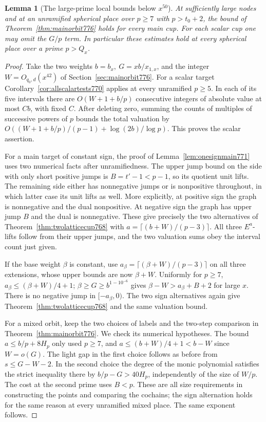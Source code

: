 \documentclass[a4paper,11pt]{article}
\newtheorem{lemma}[proposition]{Lemma}
\theoremstyle{definition}
\theoremstyle{remark}
\numberwithin{equation}{section}
\begin{document}
\begin{lemma}[The large-prime local bounds below \(x^{50}\)]
\leavevmode\label{lem:rankcutoff778}
At sufficiently large nodes and at an unramified spherical
place over \(p\ge7\) with \(p>t_0+2\), the bound of
Theorem~\ref{thm:mainorbit776} holds for every main cup.
For each scalar cup one may omit the \(G/p\) term.
In particular these estimates hold at every spherical
place over a prime \(p> Q_x\).
\end{lemma}
\begin{proof}
Take the two weights \(b=b_x,\ G=xb/x_{1,x}\), and the
integer \(W=O_{q_0,d}(x^{42})\) of
Section~\ref{sec:mainorbit776}. For a scalar target
Corollary~\ref{cor:allscalartests770} applies at every
unramified \(p\ge5\). In each of its five intervals there
are \(O(W+1+b/p)\) consecutive integers of absolute value
at most \(C b\), with fixed \(C\). After deleting zero,
summing the counts of multiples of successive powers
of \(p\) bounds the total valuation by
\(O((W+1+b/p)/(p-1)+\log(2b)/\log p)\).
This proves the scalar assertion.

For a main target of constant sign, the proof of
Lemma~\ref{lem:onesignmain771} uses two numerical facts
after unramifiedness. The upper jump bound on the side
with only short positive jumps is \(B=t'-1<p-1\), so
its quotient unit lifts. The remaining side either has
nonnegative jumps or is nonpositive throughout, in
which latter case its unit lifts as well. More explicitly,
at positive sign the graph is nonnegative and the dual
nonpositive. At negative sign the graph has upper jump
\(B\) and the dual is nonnegative. These give precisely
the two alternatives of Theorem~\ref{thm:twolatticecup768}
with \(a=\lceil(b+W)/(p-3)\rceil\). All three \(E^a\)-lifts
follow from their upper jumps, and the two valuation sums
obey the interval count just given.

If the base weight \(\beta\) is constant, use
\(a_\beta=\lceil(\beta+W)/(p-3)\rceil\) on all three
extensions, whose upper bounds are now \(\beta+W\).
Uniformly for \(p\ge7\), \(a_\beta\le(\beta+W)/4+1\);
\(\beta\ge G\ge b^{1-10^{-6}}\) gives
\(\beta-W>a_\beta+B+2\) for large \(x\).
There is no negative jump in \([-a_\beta,0)\). The two
sign alternatives again give Theorem~\ref{thm:twolatticecup768}
and the same valuation bound.

For a mixed orbit, keep the two choices of labels and
the two-step comparison in Theorem~\ref{thm:mainorbit776}.
We check its numerical hypotheses. The bound
\(a\le b/p+8H_p\) only used \(p\ge7\), and
\(a\le(b+W)/4+1<b-W\) since \(W=o(G)\).
The light gap in the first choice follows as before
from \(s\le G-W-2\). In the second choice the degree
of the monic polynomial satisfies the strict inequality
there by \(b/p-G>40H_p\), independently of the size
of \(W/p\). The cost at the second prime uses \(B<p\).
These are all size requirements in constructing the
points and comparing the cochains; the sign alternation
holds for the same reason at every unramified mixed
place. The same exponent follows.


\end{proof}
\end{document}

